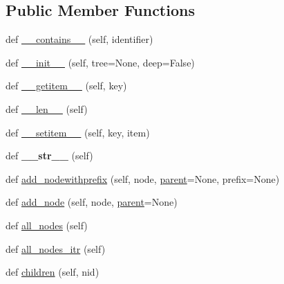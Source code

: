 \subsection*{Public Member Functions}
\begin{DoxyCompactItemize}
\item 
def \mbox{\hyperlink{classapp_1_1main_1_1treelib_1_1tree_1_1Tree_a94e2233a52f68e21298a7dc78ed4c47a}{\+\_\+\+\_\+contains\+\_\+\+\_\+}} (self, identifier)
\item 
def \mbox{\hyperlink{classapp_1_1main_1_1treelib_1_1tree_1_1Tree_adb214f44cd20809a0d7568762680a210}{\+\_\+\+\_\+init\+\_\+\+\_\+}} (self, tree=None, deep=False)
\item 
def \mbox{\hyperlink{classapp_1_1main_1_1treelib_1_1tree_1_1Tree_a730e8bf6425ef9a60c0c1602b1469b73}{\+\_\+\+\_\+getitem\+\_\+\+\_\+}} (self, key)
\item 
def \mbox{\hyperlink{classapp_1_1main_1_1treelib_1_1tree_1_1Tree_a607c0dfb091a39681621b78cb32ab2d1}{\+\_\+\+\_\+len\+\_\+\+\_\+}} (self)
\item 
def \mbox{\hyperlink{classapp_1_1main_1_1treelib_1_1tree_1_1Tree_ab4e208b78bbfb1844201256aea101fb3}{\+\_\+\+\_\+setitem\+\_\+\+\_\+}} (self, key, item)
\item 
\mbox{\label{classapp_1_1main_1_1treelib_1_1tree_1_1Tree_ac2c5d0ec2961121c92044d0f93543f7e}} 
def {\bfseries \+\_\+\+\_\+str\+\_\+\+\_\+} (self)
\item 
def \mbox{\hyperlink{classapp_1_1main_1_1treelib_1_1tree_1_1Tree_a8d9526231246f702318e9e1819868165}{add\+\_\+nodewithprefix}} (self, node, \mbox{\hyperlink{classapp_1_1main_1_1treelib_1_1tree_1_1Tree_a28ccb73f9aed492e66d879c664dc3b35}{parent}}=None, prefix=None)
\item 
def \mbox{\hyperlink{classapp_1_1main_1_1treelib_1_1tree_1_1Tree_a020b30ad1ff3cf947353487e75efcfc1}{add\+\_\+node}} (self, node, \mbox{\hyperlink{classapp_1_1main_1_1treelib_1_1tree_1_1Tree_a28ccb73f9aed492e66d879c664dc3b35}{parent}}=None)
\item 
def \mbox{\hyperlink{classapp_1_1main_1_1treelib_1_1tree_1_1Tree_a9d35f4e9e51cbccc98314ae78bb73a8f}{all\+\_\+nodes}} (self)
\item 
def \mbox{\hyperlink{classapp_1_1main_1_1treelib_1_1tree_1_1Tree_a6ec89f6f37ff6bee77e0c10d4270817c}{all\+\_\+nodes\+\_\+itr}} (self)
\item 
def \mbox{\hyperlink{classapp_1_1main_1_1treelib_1_1tree_1_1Tree_aa69c40af1b83aed2608bfaa4dedb6ff2}{children}} (self, nid)

\end{DoxyCompactItemize}

